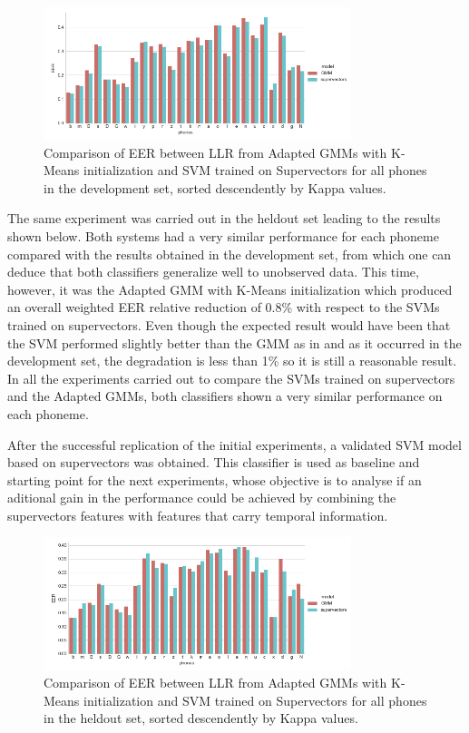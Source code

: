\begin{figure}[H]
	\centering
	\includegraphics[width=0.8\textwidth]{files/figures/results/gmm-vs-supervectors/gmm-vs-supervectors-dev.png}
	\caption{Comparison of EER between LLR from Adapted GMMs with K-Means initialization
	and SVM trained on Supervectors for all phones in the development set, sorted
	descendently by Kappa values.}
	\label{fig:gmmSupervectorsDev}
\end{figure}

The same experiment was carried out in the heldout set leading to the results shown below.
Both systems had a very similar performance for each phoneme compared with the results obtained
in the development set, from which one can deduce that both classifiers generalize well to
unobserved data. This time, however, it was the Adapted GMM with K-Means initialization
which produced an overall weighted EER relative reduction of 0.8\% with respect to the SVMs
trained on supervectors. Even though the expected result would have been that the SVM performed
slightly better than the GMM as in \cite{main} and as it occurred in the development set,
the degradation is less than 1\% so it is still a reasonable result. In all the experiments
carried out to compare the SVMs trained on supervectors and the Adapted GMMs, both classifiers
shown a very similar performance on each phoneme.

After the successful replication of the initial experiments, a validated SVM model based on
supervectors was obtained. This classifier is used as baseline and starting point for
the next experiments,
whose objective is to analyse if an aditional gain in the performance could be achieved by
combining the supervectors features with features that carry temporal information.

\begin{figure}[H]
	\centering
	\includegraphics[width=0.8\textwidth]{files/figures/results/gmm-vs-supervectors/gmm-vs-supervectors-heldout.png}
	\caption{Comparison of EER between LLR from Adapted GMMs with K-Means initialization
	and SVM trained on Supervectors for all phones in the heldout set, sorted descendently
	by Kappa values.}
	\label{fig:gmmSupervectorsTest}
\end{figure}

